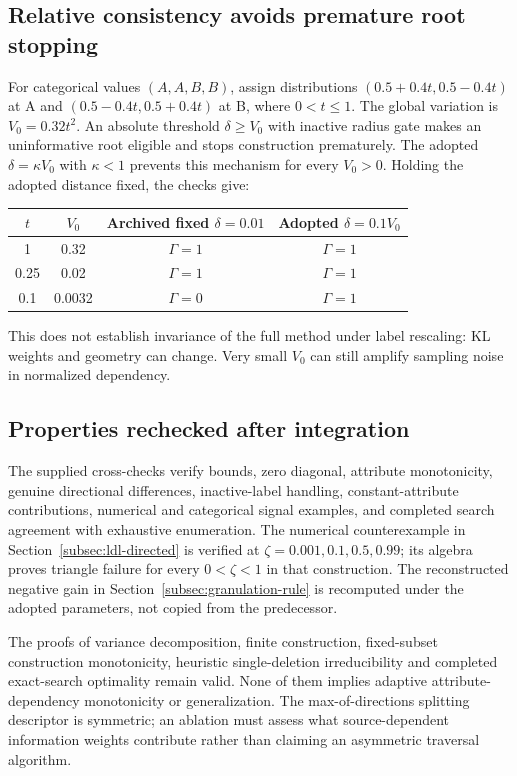 \subsection{Relative consistency avoids premature root stopping}
For categorical values $(A,A,B,B)$, assign distributions
$(0.5+0.4t,0.5-0.4t)$ at A and $(0.5-0.4t,0.5+0.4t)$ at B,
where $0<t\le1$. The global variation is $V_0=0.32t^2$.
An absolute threshold $\delta\ge V_0$ with inactive radius gate makes
an uninformative root eligible and stops construction prematurely.
The adopted $\delta=\kappa V_0$ with $\kappa<1$ prevents this mechanism
for every $V_0>0$. Holding the adopted distance fixed, the checks give:
\begin{center}
\begin{tabular}{cccc}
\hline
$t$ & $V_0$ & Archived fixed $\delta=0.01$ & Adopted $\delta=0.1V_0$\\
\hline
1 & 0.32 & $\Gamma=1$ & $\Gamma=1$\\
0.25 & 0.02 & $\Gamma=1$ & $\Gamma=1$\\
0.1 & 0.0032 & $\Gamma=0$ & $\Gamma=1$\\
\hline
\end{tabular}
\end{center}
This does not establish invariance of the full method under label
rescaling: KL weights and geometry can change. Very small $V_0$ can
still amplify sampling noise in normalized dependency.

\subsection{Properties rechecked after integration}
The supplied cross-checks verify bounds, zero diagonal, attribute
monotonicity, genuine directional differences, inactive-label handling,
constant-attribute contributions, numerical and categorical signal
examples, and completed search agreement with exhaustive enumeration.
The numerical counterexample in Section~\ref{subsec:ldl-directed} is
verified at $\zeta=0.001,0.1,0.5,0.99$; its algebra proves triangle
failure for every $0<\zeta<1$ in that construction.
The reconstructed negative gain in Section~\ref{subsec:granulation-rule}
is recomputed under the adopted parameters, not copied from the predecessor.

The proofs of variance decomposition, finite construction, fixed-subset
construction monotonicity, heuristic single-deletion irreducibility and
completed exact-search optimality remain valid. None of them implies
adaptive attribute-dependency monotonicity or generalization.
The max-of-directions splitting descriptor is symmetric; an ablation
must assess what source-dependent information weights contribute rather
than claiming an asymmetric traversal algorithm.

